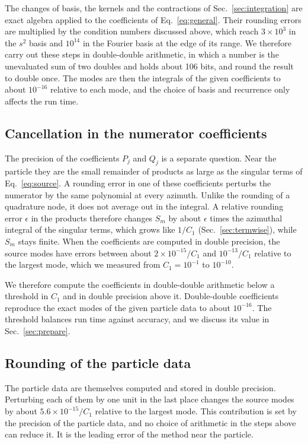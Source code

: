 \documentclass[11pt]{article}
\begin{document}
The changes of basis, the kernels and the contractions of
Sec.~\ref{sec:integration} are exact algebra applied to the coefficients of
Eq.~\eqref{eq:general}. Their rounding errors are multiplied by the condition
numbers discussed above, which reach $3\times10^3$ in the $s^2$ basis and
$10^{14}$ in the Fourier basis at the edge of its range. We therefore carry out
these steps in double-double arithmetic, in which a number is the unevaluated
sum of two doubles and holds about 106 bits, and round the result to double
once. The modes are then the integrals of the given coefficients to about
$10^{-16}$ relative to each mode, and the choice of basis and recurrence only
affects the run time.

\subsection{Cancellation in the numerator coefficients}

The precision of the coefficients $P_j$ and $Q_j$ is a separate question. Near
the particle they are the small remainder of products as large as the singular
terms of Eq.~\eqref{eq:source}. A rounding error in one of these coefficients
perturbs the numerator by the same polynomial at every azimuth. Unlike the
rounding of a quadrature node, it does not average out in the integral. A
relative rounding error $\epsilon$ in the products therefore changes $S_m$ by
about $\epsilon$ times the azimuthal integral of the singular terms, which grows
like $1/C_1$ (Sec.~\ref{sec:termwise}), while $S_m$ stays finite. When the
coefficients are computed in double precision, the source modes have errors
between about $2\times10^{-15}/C_1$ and $10^{-13}/C_1$ relative to the largest
mode, which we measured from $C_1=10^{-1}$ to $10^{-10}$.

We therefore compute the coefficients in double-double arithmetic below a
threshold in $C_1$ and in double precision above it. Double-double coefficients
reproduce the exact modes of the given particle data to about $10^{-16}$. The
threshold balances run time against accuracy, and we discuss its value in
Sec.~\ref{sec:prepare}.

\subsection{Rounding of the particle data}

The particle data are themselves computed and stored in double precision.
Perturbing each of them by one unit in the last place changes the source modes
by about $5.6\times10^{-15}/C_1$ relative to the largest mode. This
contribution is set by the precision of the particle data, and no choice of
arithmetic in the steps above can reduce it. It is the leading error of the
method near the particle.
\end{document}

